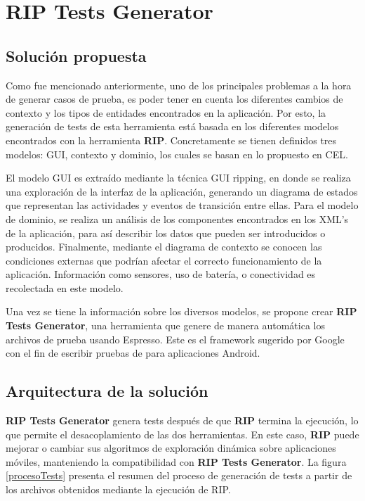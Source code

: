 \chapter{RIP Tests Generator}
\label{chapter3}

\section{Solución propuesta}
Como fue mencionado anteriormente, uno de los principales problemas a la hora de generar casos de prueba, es poder tener en cuenta los diferentes cambios de contexto y los tipos de entidades encontrados en la aplicación. Por esto, la generación de tests de esta herramienta está basada en los diferentes modelos encontrados con la herramienta  \textbf{RIP}\cite{LinanAutomatedApps}. Concretamente se tienen definidos tres modelos: GUI, contexto y dominio, los cuales se basan en lo propuesto en CEL\cite{Linares-Vasquez2017ContinuousTesting}.

El modelo GUI es extraído mediante la técnica GUI ripping, en donde se realiza una exploración de la interfaz de la aplicación, generando un diagrama de estados que representan las actividades y eventos de transición entre ellas. Para el modelo de dominio, se realiza un análisis de los componentes encontrados en los XML's de la aplicación, para así describir los datos que pueden ser introducidos o producidos. Finalmente, mediante el diagrama de contexto se conocen las condiciones externas que podrían afectar el correcto funcionamiento de la aplicación. Información como sensores,  uso de batería, o conectividad es recolectada en este modelo.

Una vez se tiene la información sobre los diversos modelos, se propone crear \textbf{RIP Tests Generator}, una herramienta que genere de manera automática los archivos de prueba usando Espresso. Este es el framework sugerido por Google con el fin de escribir pruebas de para aplicaciones Android.



\section{Arquitectura de la solución}

\textbf{RIP Tests Generator} genera tests después de que \textbf{RIP} termina la ejecución, lo que permite el desacoplamiento de las dos herramientas. En este caso, \textbf{RIP} \cite{LinanAutomatedApps} puede mejorar o cambiar sus algoritmos de exploración dinámica sobre aplicaciones móviles, manteniendo la compatibilidad con \textbf{RIP Tests Generator}. La figura \ref{procesoTests} presenta el resumen del proceso de generación de tests a partir de los archivos obtenidos mediante la ejecución de RIP.

